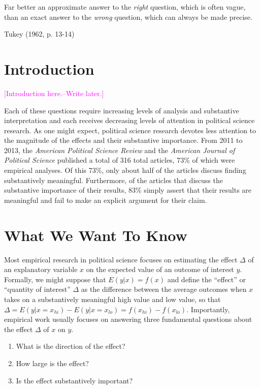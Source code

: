 \documentclass[12pt]{article}
\newcommand{\carlisle}[1]{\textcolor{magenta}{#1}}
\begin{document}
\epigraph{Far better an approximate answer to the \textit{right} question, which is often vague, than an exact answer to the \textit{wrong} question, which can always be made precise.}{Tukey (1962, p. 13-14)}

\thispagestyle{empty}

\newpage
\doublespace

\section*{Introduction}

\carlisle{[Introduction here.--Write later.]}

Each of these questions require increasing levels of analysis and substantive interpretation and each receives decreasing levels of attention in political science research. As one might expect, political science research devotes less attention to the magnitude of the effects and their substantive importance. From 2011 to 2013, the \textit{American Political Science Review} and the \textit{American Journal of Political Science} published a total of 316 total articles, 73\% of which were empirical analyses. Of this 73\%, only about half of the articles discuss finding substantively meaningful. Furthermore, of the articles that discuss the substantive importance of their results, 83\% simply assert that their results are meaningful and fail to make an explicit argument for their claim.

\section*{What We Want To Know}

Most empirical research in political science focuses on estimating the effect $\Delta$ of an explanatory variable $x$ on the expected value of an outcome of interest $y$. Formally, we might suppose that $E(y | x) = f(x)$ and define the ``effect'' or ``quantity of interest'' $\Delta$ as the difference between the average outcomes when $x$ takes on a substantively meaningful high value and low value, so that $\Delta = E(y | x = x_{hi}) - E(y | x = x_{lo}) = f(x_{hi}) - f(x_{lo})$. Importantly, empirical work usually focuses on answering three fundamental questions about the effect $\Delta$ of $x$ on $y$. 

\begin{enumerate}
\item What is the direction of the effect?
\item How large is the effect?
\item Is the effect substantively important?
\end{enumerate}
\end{document}
